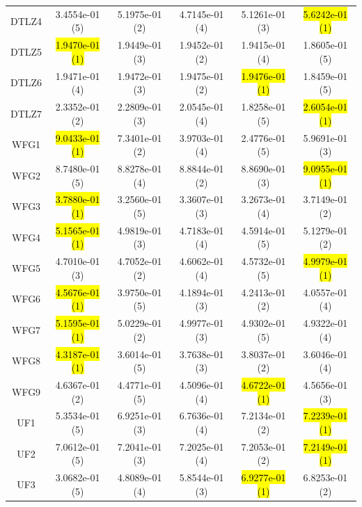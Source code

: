 \documentclass[journal]{IEEEtran}
\begin{document}
\begin{table}[tbp]
\begin{tabular}{cccccc}
    DTLZ4           & 3.4554e-01 (5)      & 5.1975e-01 (2)      & 4.7145e-01 (4)    & 5.1261e-01 (3)      & \hl{5.6242e-01 (1)} \\
    DTLZ5           & \hl{1.9470e-01 (1)} & 1.9449e-01 (3)      & 1.9452e-01 (2)    & 1.9415e-01 (4)      & 1.8605e-01 (5)      \\
    DTLZ6           & 1.9471e-01 (4)      & 1.9472e-01 (3)      & 1.9475e-01 (2)    & \hl{1.9476e-01 (1)} & 1.8459e-01 (5)      \\
    DTLZ7           & 2.3352e-01 (2)      & 2.2809e-01 (3)      & 2.0545e-01 (4)    & 1.8258e-01 (5)      & \hl{2.6054e-01 (1)} \\
    \hline
    WFG1            & \hl{9.0433e-01 (1)} & 7.3401e-01 (2)      & 3.9703e-01 (4)    & 2.4776e-01 (5)      & 5.9691e-01 (3)      \\
    WFG2            & 8.7480e-01 (5)      & 8.8278e-01 (4)      & 8.8844e-01 (2)    & 8.8690e-01 (3)      & \hl{9.0955e-01 (1)} \\
    WFG3            & \hl{3.7880e-01 (1)} & 3.2560e-01 (5)      & 3.3607e-01 (3)    & 3.2673e-01 (4)      & 3.7149e-01 (2)      \\
    WFG4            & \hl{5.1565e-01 (1)} & 4.9819e-01 (3)      & 4.7183e-01 (4)    & 4.5914e-01 (5)      & 5.1279e-01 (2)      \\
    WFG5            & 4.7010e-01 (3)      & 4.7052e-01 (2)      & 4.6062e-01 (4)    & 4.5732e-01 (5)      & \hl{4.9979e-01 (1)} \\
    WFG6            & \hl{4.5676e-01 (1)} & 3.9750e-01 (5)      & 4.1894e-01 (3)    & 4.2413e-01 (2)      & 4.0557e-01 (4)      \\
    WFG7            & \hl{5.1595e-01 (1)} & 5.0229e-01 (2)      & 4.9977e-01 (3)    & 4.9302e-01 (5)      & 4.9322e-01 (4)      \\
    WFG8            & \hl{4.3187e-01 (1)} & 3.6014e-01 (5)      & 3.7638e-01 (3)    & 3.8037e-01 (2)      & 3.6046e-01 (4)      \\
    WFG9            & 4.6367e-01 (2)      & 4.4771e-01 (5)      & 4.5096e-01 (4)    & \hl{4.6722e-01 (1)} & 4.5656e-01 (3)      \\
    \hline
    UF1             & 5.3534e-01 (5)      & 6.9251e-01 (3)      & 6.7636e-01 (4)    & 7.2134e-01 (2)      & \hl{7.2239e-01 (1)} \\
    UF2             & 7.0612e-01 (5)      & 7.2041e-01 (3)      & 7.2025e-01 (4)    & 7.2053e-01 (2)      & \hl{7.2149e-01 (1)} \\
    UF3             & 3.0682e-01 (5)      & 4.8089e-01 (4)      & 5.8544e-01 (3)    & \hl{6.9277e-01 (1)} & 6.8253e-01 (2)      \\

\end{tabular}
\end{table}
\end{document}
